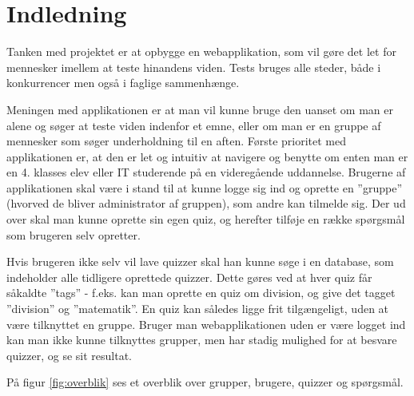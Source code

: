 \chapter{Indledning}
Tanken med projektet er at opbygge en webapplikation, som vil gøre det let for mennesker imellem at teste hinandens viden. Tests bruges alle steder, både i konkurrencer men også i faglige sammenhænge. 

Meningen med applikationen er at man vil kunne bruge den uanset om man er alene og søger at teste viden indenfor et emne, eller om man er en gruppe af mennesker som søger underholdning til en aften. 
Første prioritet med applikationen er, at den er let og intuitiv at navigere og benytte om enten man er en 4. klasses elev eller IT studerende på en videregående uddannelse. 
Brugerne af applikationen skal være i stand til at kunne logge sig ind og oprette en ''gruppe'' (hvorved de bliver administrator af gruppen), som andre kan tilmelde sig. Der ud over skal man kunne oprette sin egen quiz, og herefter tilføje en række spørgsmål som brugeren selv opretter. 

Hvis brugeren ikke selv vil lave quizzer skal han kunne søge i en database, som indeholder alle tidligere oprettede quizzer. Dette gøres ved at hver quiz får såkaldte ''tags'' - f.eks. kan man oprette en quiz om division, og give det tagget ''division'' og ''matematik''. En quiz kan således ligge frit tilgængeligt, uden at være tilknyttet en gruppe. Bruger man webapplikationen uden er være logget ind kan man ikke kunne tilknyttes grupper, men har stadig mulighed for at besvare quizzer, og se sit resultat.

På figur \ref{fig:overblik} ses et overblik over grupper, brugere, quizzer og spørgsmål.

